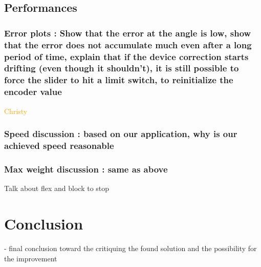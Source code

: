 \documentclass[lettersize,journal]{IEEEtran}
\begin{document}
\subsection{Performances}

\subsubsection{Error plots : Show that the error at the angle is low, show that the error does not accumulate much even after a long period of time, explain that if the device correction starts drifting (even though it shouldn't), it is still possible to force the slider to hit a limit switch, to reinitialize the encoder value} \textcolor{orange}{Christy}
\subsubsection{Speed discussion : based on our application, why is our achieved speed reasonable}
\subsubsection{Max weight discussion : same as above}
Talk about flex and block to stop








\section{Conclusion}

- final conclusion toward the critiquing the found solution and the possibility for the improvement
\end{document}
